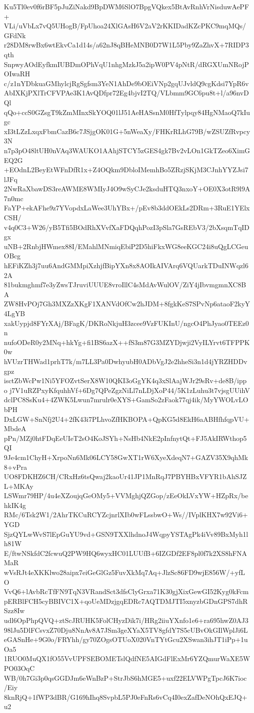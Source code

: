 Ku5Tl0ev0f6rBF5pJuZiNakd9BpDWM6SlO7BpgVQkex5BtAvRnhVrNisduwAePF+
VLi/uVbLx7vQ5UHogB/FpUhoa24XlGAsH6V2aV2rKKIDadKZcPKC9mqMQs/GFdNk
r28DM8rwBx6wtEkvCa1d14s/a62nJ8qBHeMNB0D7W1L5Pby9ZaZhvX+7RIDP3qth
SnpwyAOdEyfkmIUBDmOPhVqU1nhgMzkJ5a2ipW0PV4pNtR/dRGXUmNRojPOIwaRH
c/z1nYDbkuaGMhylcjRgSgfsm3YeN1AhDe9bOEiVNp2gqUJvldQ9cgKdsi7YpR6v
AbIXKjPXlTrCFVPAe3K1AvQDfpr72Eg4bjvI2TQ/VLbmm9GC6pu8t+l/a96nvDQl
qQo+ccS0GZsgT9kZmMInxSkYOQ01lJ51AeHASsnM0HfTylpqy84HgNMaoQ7kIugc
xI3tLZzLxqxFbmCazB6c7JSjgOK01G+5nWeaXy/FHKrRLhG79B/wZSUZfRvpcy3N
n7p3pO48ltUH0nVAq3WAUKO1AAhjSTCY5zGES4gk7Bv2vLOn1GkTZeo6XimGEQ2G
+EOdnL2BeyEtWFnDfR1x+Z4OQkm9DbloIMemhBo5ZRzjSKjM3CJnhYYZJsi7lJFq
2NwRaXbawDS3reAWME8WMIyJ4O9wSyCJe2ksduHTQ3nxoY+OE0X3otR9l9A7n0mc
FaYP+ekAFhe9z7YVopdxLaWee3UhYBx+/pEv8b3ddOEkLs2DRm+3RuE1YElxCSH/
v4q0C3+W26/yB5Tfi5BOdRhXVvfXaFDQqhPozI3pSla7GsREbV3/2bXsqmTqIDgx
uNB+2RnbjHWmex88I/EMahlMNmiqEbiP2D5hiFkxWG8eeKGC24i8uQgLCGeuOBcg
hEFiKZh3j7uu6AndGMMpiXzhjfBipYXn8x8AOIkAIVArq6VQUarkTDuINWqzl62A
81bukmghmf7e3yZwsTJruviUUUE8vroIllC4sMdAvWulOV/ZiY4jIbvmgmnXC8BA
ZW8HvPOj7Gh3MXZzXKgF1XANVdOfCw2hJDM+8fgkKeS7SPvNp6ataoF2kyY4LgYB
xakUypjd8FYrXAj/BFagK/DKRoNkjuH3zcee9VzFUKInU/ngcO4PhJyao0TEEz0n
nufoODeR0y2MNq+hkYg+fi1BS6azX++fS3m87G3MZYDjwji2VyILYrvt6TFPPK0w
hVUzrTHWad1prhT7k/m7LL3Pa0DwhyubH0ADbVgJ2e2hheSi3n1d4jYRZHDDvgpz
isctZbWcPw1Ni5YFOZvtSerX8W10QKI3oGgYK4q3xSlAajWJr29sRv+de8B/ippo
j7V1uRZPxyKfquhhVf+6Dg7QPeZgzNiLl7nLDjXoP44/5K1zLuhu3t7vjsgUUihV
dclPC8SsKu4+4ZWK5Lwun7mrulr0eXYS+GamSo2zFaok77qj4ik/MyYWOLvLObPH
DxLGW+SnNfj2U4+2fK43i7PLhvoZfHKBOPA+QpKG5d8EkH6aABHfhfqpVU+MbdeA
pPn/MZj0htFDqEeUIeT2sO4KoJSYh+NsHb4NkE2pInfnytQt+FJ5AkIRWthop5QI
9Je4cm1ChyH+XrpoNn6Mk06LCY58GwXT1rW6XyeXdeqN7+GAZV35X9qhMk8+vPra
UO8FDKHZ6CH/CRxHz6tsQwaj2kaoUr41JP1MnRqJ7PBYHBxVFYR1bAhSJZL+MKAy
LSWmr79HP/4u4eXZoujqGeOMy5+VVMghjQZGop/zEeOkLVxYW+HZpRx/behkIK4g
RMc/6Tsk2W1/2AhrTKCuRCYZcjnrlXIb0wFLssbwO+Ws//IVplKHX7w92Vi6+YGD
SjzQYLwWvS7lEpGuYU9vd+GSN9TXXlhdnoJ4WqpyYSTAgPk4iVv89BxMyh1lh81W
E/ftwNSkfdC2fcwuQ2PW9HQ6wyxHC01LUUfB+6IZGDf2EF8pl0f7k2XS8hFNAMaR
wVsRJt4eXKKlwo28aipx7eiGeGlGz5FuvXkMq7Aq+JlzSc86FD9wjE856W/+yfLO
VvQ6+lAvbRcTfFN9TqN3VRandSct3dfsClyGrxa71K30gjXixGewGI52Kyg0kFcm
pERBlFCH5cyBBIVC1X+qoUeMDzjgqEDRc7AQTDMJTI5xnyzbGDnGPS7dhRSzz8Iw
udl6OpPhpQVQ+ztScJRUHK5FolCHyzDik7i/HRg2iiuYXnfo1e6+ra695hwZ0AJ3
98lJu5DlFCsvxZ70Dju8NnAv8A7JSm3geXYaX5TV8gfdY7S5cUBvOkGIlWplJi6L
eGASnHe+9G0o/FRYhh/gy70ZOgsOTUoX020VnTYtGcu2XSwan3ihJT1iPp+1uOa5
1RUO0MuQX1fO55VvUPFSEBOMETslQdfNE5AIGdFlExMr6YZQmurWaXE5WPO03OqC
WB/0h7Gi3p0qsGGDJm6eWnBzP+StrJbS6hMGE5+uxf22ELVWPgTpcJ6K7ioc/Eiy
8knRjQ+1fWP3dBR/G169hIhq8SvpbL5PJ0eFnRs6vCq4I0exZafDeNOhQxEJQ+u2
